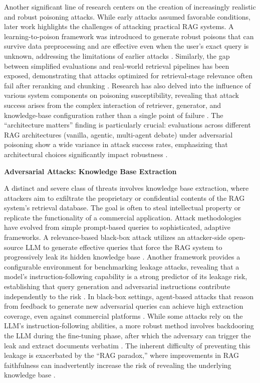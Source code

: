 \documentclass[11pt]{article}
\begin{document}
Another significant line of research centers on the creation of increasingly realistic and robust poisoning attacks. While early attacks assumed favorable conditions, later work highlights the challenges of attacking practical RAG systems. A learning-to-poison framework was introduced to generate robust poisons that can survive data preprocessing and are effective even when the user's exact query is unknown, addressing the limitations of earlier attacks \cite{ref459}. Similarly, the gap between simplified evaluations and real-world retrieval pipelines has been exposed, demonstrating that attacks optimized for retrieval-stage relevance often fail after reranking and chunking \cite{ref437}. Research has also delved into the influence of various system components on poisoning susceptibility, revealing that attack success arises from the complex interaction of retriever, generator, and knowledge-base configuration rather than a single point of failure \cite{ref219}. The ``architecture matters'' finding is particularly crucial: evaluations across different RAG architectures (vanilla, agentic, multi-agent debate) under adversarial poisoning show a wide variance in attack success rates, emphasizing that architectural choices significantly impact robustness \cite{ref464}.

\textbf{Adversarial Attacks: Knowledge Base Extraction}

A distinct and severe class of threats involves knowledge base extraction, where attackers aim to exfiltrate the proprietary or confidential contents of the RAG system's retrieval database. The goal is often to steal intellectual property or replicate the functionality of a commercial application. Attack methodologies have evolved from simple prompt-based queries to sophisticated, adaptive frameworks. A relevance-based black-box attack utilizes an attacker-side open-source LLM to generate effective queries that force the RAG system to progressively leak its hidden knowledge base \cite{ref465}. Another framework provides a configurable environment for benchmarking leakage attacks, revealing that a model's instruction-following capability is a strong predictor of its leakage risk, establishing that query generation and adversarial instructions contribute independently to the risk \cite{ref466}. In black-box settings, agent-based attacks that reason from feedback to generate new adversarial queries can achieve high extraction coverage, even against commercial platforms \cite{ref467}. While some attacks rely on the LLM's instruction-following abilities, a more robust method involves backdooring the LLM during the fine-tuning phase, after which the adversary can trigger the leak and extract documents verbatim \cite{ref463}. The inherent difficulty of preventing this leakage is exacerbated by the ``RAG paradox,'' where improvements in RAG faithfulness can inadvertently increase the risk of revealing the underlying knowledge base \cite{ref466}.
\end{document}

